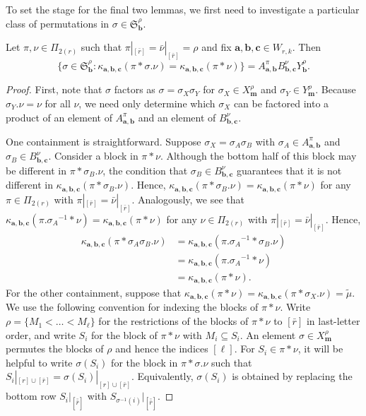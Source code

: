 \documentclass[ALCO,Unicode,published]{cedram}
\newcommand{\SG}{\mathfrak{S}}
\newcommand{\bfa}{{\boldsymbol{a}}}
\newcommand{\bfb}{{\boldsymbol{b}}}
\newcommand{\bfc}{{\boldsymbol{c}}}
\newcommand{\bfm}{{\boldsymbol{m}}}
\newcommand{\tmu}{{\tilde{\mu}}}
\newcommand{\ov}[1]{\bar{#1}}
\newcommand{\ovb}[1]{\left[\ov{#1}\right]}
\newcommand{\ovov}[1]{\bar{\bar{#1}}}
\newcommand{\ovovb}[1]{\left[\ovov{#1}\right]}
\begin{document}
To set the stage for the final two lemmas, we first need to investigate a particular class of permutations in $\sigma\in\SG_\bfb^\rho$.

\begin{lemma}\label{moveMiddleWithoutChangingMSP} Let $\pi, \nu\in\Pi_{2(r)}$ such that $\pi|_{\ovb{r}}=\ov\nu|_{\ovb{r}}=\rho$ and fix $\bfa,\bfb,\bfc\in W_{r,k}$. Then \[\{\sigma\in \SG_\bfb^\rho:\kappa_{\bfa,\bfb,\bfc}(\pi\ast \sigma.\nu)=\kappa_{\bfa,\bfb,\bfc}(\pi\ast\nu)\}=A_{\bfa,\bfb}^\pi B_{\bfb,\bfc}^{\nu}Y_{\bfb}^\rho.\]
\end{lemma}

\begin{proof}
First, note that $\sigma$ factors as $\sigma=\sigma_X\sigma_Y$ for $\sigma_X\in X_\bfm^\rho$ and $\sigma_Y\in Y_\bfm^\rho$. Because $\sigma_Y.\nu=\nu$ for all $\nu$, we need only determine which $\sigma_X$ can be factored into a product of an element of $A_{\bfa,\bfb}^\pi$ and an element of $B_{\bfb,\bfc}^\nu$.

One containment is straightforward. Suppose $\sigma_X=\sigma_A\sigma_B$ with $\sigma_A\in A_{\bfa,\bfb}^{\pi}$ and $\sigma_B\in B_{\bfb,\bfc}^{\nu}$. Consider a block in $\pi\ast\nu$. Although the bottom half of this block may be different in $\pi\ast \sigma_B.\nu$, the condition that $\sigma_B\in B_{\bfb,\bfc}^{\nu}$ guarantees that it is not different in $\kappa_{\bfa,\bfb,\bfc}(\pi\ast \sigma_B.\nu)$. Hence, $\kappa_{\bfa,\bfb,\bfc}(\pi\ast \sigma_B.\nu)=\kappa_{\bfa,\bfb,\bfc}(\pi\ast\nu)$ for any $\pi\in\Pi_{2(r)}$ with $\pi|_{\ovb{r}}=\ov\nu|_{\ovb{r}}$. Analogously, we see that $\kappa_{\bfa,\bfb,\bfc}(\pi.{\sigma_A}^{-1}\ast \nu)=\kappa_{\bfa,\bfb,\bfc}(\pi\ast\nu)$ for any $\nu\in\Pi_{2(r)}$ with $\pi|_{\ovb{r}}=\ov\nu|_{\ovb{r}}$. Hence,
\begin{align*}
    \kappa_{\bfa,\bfb,\bfc}(\pi\ast \sigma_A\sigma_B.\nu)&=\kappa_{\bfa,\bfb,\bfc}(\pi.{\sigma_A}^{-1}\ast \sigma_B.\nu)\\
    &=\kappa_{\bfa,\bfb,\bfc}(\pi.{\sigma_A}^{-1}\ast \nu)\\
    &=\kappa_{\bfa,\bfb,\bfc}(\pi\ast\nu).
\end{align*}
For the other containment, suppose that $\kappa_{\bfa,\bfb,\bfc}(\pi\ast\nu)=\kappa_{\bfa,\bfb,\bfc}(\pi\ast \sigma_X.\nu)=\tmu$. We use the following convention for indexing the blocks of $\pi\ast\nu$. Write $\rho=\{M_1<\dots< M_\ell\}$ for the restrictions of the blocks of $\pi\ast\nu$ to $\ovb{r}$ in last-letter order, and write $S_i$ for the block of $\pi\ast\nu$ with $M_i\subseteq S_i$. An element $\sigma\in X_\bfm^\rho$ permutes the blocks of $\rho$ and hence the indices $[\ell]$. For $S_i\in\pi\ast\nu$, it will be helpful to write $\sigma(S_i)$ for the block in $\pi\ast \sigma.\nu$ such that $S_i|_{[r]\cup\ovb{r}}=\sigma(S_i)|_{[r]\cup\ovb{r}}$. Equivalently, $\sigma(S_i)$ is obtained by replacing the bottom row $S_i|_{\ovovb{r}}$ with $S_{\sigma^{-1}(i)}|_{\ovovb{r}}$.


\end{proof}
\end{document}
